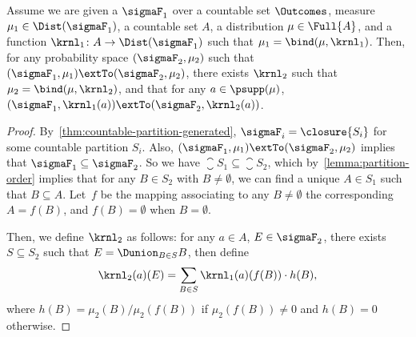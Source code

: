 \begin{lemma}
 \label{lemma:bind-extend}
 Assume we are given a \salgebra{} $\sigmaF_1$
 over a countable set $\Outcomes$,
 measure $\mu_1 \in \Dist(\sigmaF_1)$,
 a countable set $A$,
 a distribution $\mu \in \Full{A}$,
 and a function $\krnl_1 \colon A \to \Dist(\sigmaF_1)$
 such that $\mu_1 = \bind(\mu, \krnl_1)$.
 Then, for any probability space $(\sigmaF_2, \mu_2)$ such that
 $(\sigmaF_1, \mu_1) \extTo (\sigmaF_2, \mu_2)$,
 there exists $\krnl_2$ such that $\mu_2 = \bind(\mu, \krnl_2)$,
 and that for any $a \in \psupp(\mu)$,
 $(\sigmaF_1, \krnl_1(a)) \extTo (\sigmaF_2, \krnl_2(a))$.
\end{lemma}

\begin{proof}
  By~\cref{thm:countable-partition-generated},
  $\sigmaF_i = \closure{S_i}$ for some countable partition $S_i$.
  Also, $(\sigmaF_1, \mu_1) \extTo (\sigmaF_2, \mu_2)$ implies that
  $\sigmaF_1 \subseteq \sigmaF_2$.
  So we have $\closure{S_1} \subseteq \closure{S_2}$,
  which by~\cref{lemma:partition-order} implies that
  for any $B \in S_2$ with $B \ne \emptyset$,
  we can find a unique $A \in S_1$ such that $B \subseteq A$.
  Let~$f$ be the mapping associating to any $B\ne \emptyset$
  the corresponding $A = f(B)$, and $f(B)=\emptyset$ when $B=\emptyset$.

  Then, we define $\krnl_2$ as follows:
  for any $a \in A$, $E \in \sigmaF_2$,
  there exists $S \subseteq S_2$ such that
  $E = \Dunion_{B \in S} B$,
  then define
\begin{align*}
   \krnl_2(a)(E) = \sum_{B \in S} \krnl_1(a)(f(B)) \cdot h(B),
  \end{align*}
  where
  $h(B) = \mu_2(B) / \mu_2(f(B))$ if $ \mu_2(f(B)) \neq 0$
  and $h(B) = 0$ otherwise.


\end{proof}
